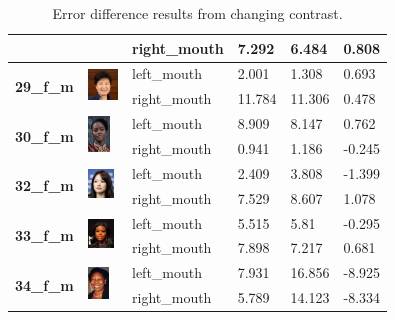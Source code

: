 \documentclass{l4proj}
\begin{document}
\begin{table}[h!]
\begin{tabular}{|l|l|l|l|l|l|}
 &  & right\_mouth & 7.292 & 6.484 & 0.808 \\ \hline
\multirow{2}{*}{\textbf{29\_f\_m}} & \multirow{2}{*}{\includegraphics[width=8mm]{images/29_f_m.jpg}} & left\_mouth & 2.001 & 1.308 & 0.693 \\ \cline{3-6} 
 &  & right\_mouth & 11.784 & 11.306 & 0.478 \\ \hline
\multirow{2}{*}{\textbf{30\_f\_m}} & \multirow{2}{*}{\includegraphics[width=6mm]{images/30_f_m.jpg}} & left\_mouth & 8.909 & 8.147 & 0.762 \\ \cline{3-6} 
 &  & right\_mouth & 0.941 & 1.186 & -0.245 \\ \hline
\multirow{2}{*}{\textbf{32\_f\_m}} & \multirow{2}{*}{\includegraphics[width=7mm]{images/32_f_m.jpg}} & left\_mouth & 2.409 & 3.808 & -1.399 \\ \cline{3-6} 
 &  & right\_mouth & 7.529 & 8.607 & 1.078 \\ \hline
\multirow{2}{*}{\textbf{33\_f\_m}} & \multirow{2}{*}{\includegraphics[width=7mm]{images/33_f_m.jpg}} & left\_mouth & 5.515 & 5.81 & -0.295 \\ \cline{3-6} 
 &  & right\_mouth & 7.898 & 7.217 & 0.681 \\ \hline
\multirow{2}{*}{\textbf{34\_f\_m}} & \multirow{2}{*}{\includegraphics[width=5.5mm]{images/34_f_m.jpg}} & left\_mouth & 7.931 & 16.856 & -8.925 \\ \cline{3-6} 
 &  & right\_mouth & 5.789 & 14.123 & -8.334 \\ \hline
\end{tabular}
\vspace*{3mm}
\caption{Error difference results from changing contrast.}
\label{results_changed}
\end{table}

\end{document}
